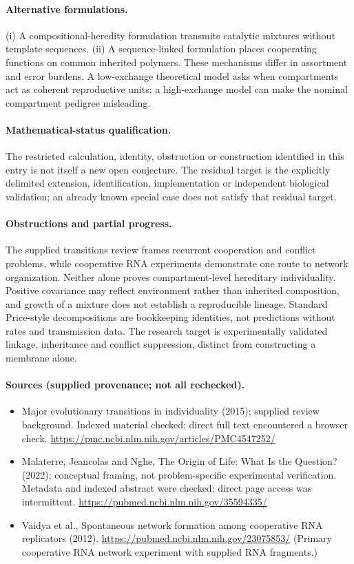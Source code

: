 \documentclass[11pt]{article}
\begin{document}
\paragraph{Alternative formulations.} (i) A compositional-heredity formulation transmits catalytic mixtures without template sequences. (ii) A sequence-linked formulation places cooperating functions on common inherited polymers. These mechanisms differ in assortment and error burdens. A low-exchange theoretical model asks when compartments act as coherent reproductive units; a high-exchange model can make the nominal compartment pedigree misleading.

\paragraph{Mathematical-status qualification.} The restricted calculation, identity, obstruction or construction identified in this entry is not itself a new open conjecture. The residual target is the explicitly delimited extension, identification, implementation or independent biological validation; an already known special case does not satisfy that residual target.

\paragraph{Obstructions and partial progress.} The supplied transitions review frames recurrent cooperation and conflict problems, while cooperative RNA experiments demonstrate one route to network organization. Neither alone proves compartment-level hereditary individuality. Positive covariance may reflect environment rather than inherited composition, and growth of a mixture does not establish a reproducible lineage. Standard Price-style decompositions are bookkeeping identities, not predictions without rates and transmission data. The research target is experimentally validated linkage, inheritance and conflict suppression, distinct from constructing a membrane alone.

\paragraph{Sources (supplied provenance; not all rechecked).} \begin{itemize}
\item Major evolutionary transitions in individuality (2015); supplied review background. Indexed material checked; direct full text encountered a browser check. \url{https://pmc.ncbi.nlm.nih.gov/articles/PMC4547252/}
\item Malaterre, Jeancolas and Nghe, The Origin of Life: What Is the Question? (2022); conceptual framing, not problem-specific experimental verification. Metadata and indexed abstract were checked; direct page access was intermittent. \url{https://pubmed.ncbi.nlm.nih.gov/35594335/}
\item Vaidya et al., Spontaneous network formation among cooperative RNA replicators (2012). \url{https://pubmed.ncbi.nlm.nih.gov/23075853/} (Primary cooperative RNA network experiment with supplied RNA fragments.)
\end{itemize}
\end{document}
